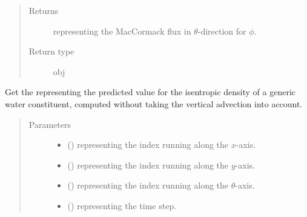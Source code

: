 \documentclass[letterpaper,10pt,english]{sphinxmanual}
\begin{document}
\begin{fulllineitems}
\begin{fulllineitems}
\begin{quote}
\begin{description}
\begin{itemize}
\end{itemize}

\item[{Returns}] \leavevmode
{} representing the MacCormack flux in \(\theta\)-direction for \(\phi\).

\item[{Return type}] \leavevmode
obj

\end{description}\end{quote}

\end{fulllineitems}


\begin{fulllineitems}
\label{\detokenize{api:tasmania.dycore.flux_isentropic_maccormack.FluxIsentropicMacCormack._get_maccormack_horizontal_predicted_value_Q}}
Get the  representing the predicted value for the isentropic
density of a generic water constituent, computed without taking the vertical advection into account.
\begin{quote}\begin{description}
\item[{Parameters}] \leavevmode\begin{itemize}
\item {} 
 () \textendash{}  representing the index running along the \(x\)-axis.

\item {} 
 () \textendash{}  representing the index running along the \(y\)-axis.

\item {} 
 () \textendash{}  representing the index running along the \(\theta\)-axis.

\item {} 
 () \textendash{}  representing the time step.


\end{itemize}
\end{description}
\end{quote}
\end{fulllineitems}
\end{fulllineitems}
\end{document}
